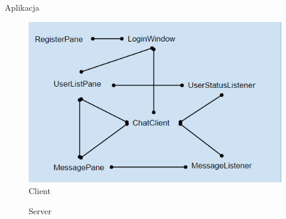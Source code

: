 \documentclass{beamer}
\begin{document}
\begin{frame}{Aplikacja}
\begin{figure}
\centering
  \begin{minipage}[b]{0.7\textwidth}
\includegraphics[width=\textwidth,left]{app1}
Client
\end{minipage}
  \begin{minipage}[b]{0.28\textwidth}
Server
 \end{minipage}
\end{figure}
\end{frame}
\end{document}

